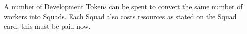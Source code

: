 A number of Development Tokens can be spent to convert the same number of workers into Squads. Each Squad also costs resources as stated on the Squad card; this must be paid now.